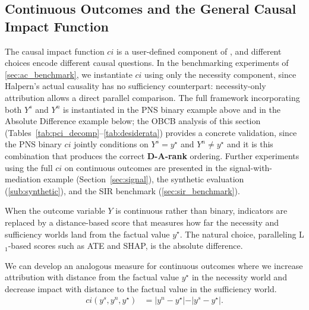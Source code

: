 
\subsection{Continuous Outcomes and the General Causal Impact Function}
\label{sub:continuous_ci}

\noindent The causal impact function $ci$ is a user-defined component of \ourapproach, and different choices encode different causal questions. In the benchmarking experiments of \cref{sec:ac_benchmark}, we instantiate $ci$ using only the necessity component, since Halpern’s actual causality has no sufficiency counterpart: necessity-only attribution allows a direct parallel comparison. The full framework incorporating both $Y^s$ and $Y^n$ is instantiated in the PNS binary
example above and in the Absolute Difference example below; the OBCB analysis of this
section (Tables~\ref{tab:pci_decomp}--\ref{tab:desiderata}) provides a concrete
validation, since the PNS binary $ci$ jointly conditions on $Y^s=y^\star$ and
$Y^n\neq y^\star$ and it is this combination that produces the correct
\textbf{D-A-rank} ordering. Further experiments using the full $ci$ on continuous outcomes are presented in
the signal-with-mediation example (Section~\ref{sec:signal}), the synthetic
evaluation (\cref{sub:synthetic}), and the SIR benchmark
(\cref{sec:sir_benchmark}).

When the outcome variable $Y$ is continuous rather than binary, indicators are replaced by a distance-based score that measures how far the necessity and sufficiency worlds land from the factual value $y^\star$.
The natural choice, paralleling L$_1$-based scores such as ATE and SHAP, is the absolute difference.

\begin{example} \label{ex:absolute_score}
We can develop an analogous measure for continuous outcomes where we increase attribution with distance from the factual value $y^\star$ in the necessity world and decrease impact with distance to the factual value in the sufficiency world.
\begin{align*}
ci(y^s, y^n, y^\star) & = \vert y^n - y^\star \vert   - \vert y^s - y^\star \vert.
\end{align*}
\end{example}

